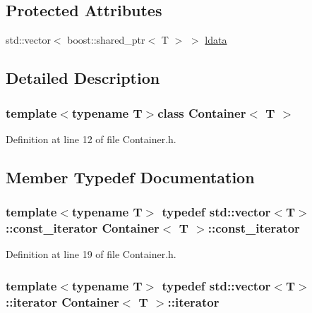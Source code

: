 \subsection*{Protected Attributes}
\begin{DoxyCompactItemize}
\item 
std::vector$<$ boost::shared\_\-ptr$<$ T $>$ $>$ \hyperlink{class_container_aef055b4e4f94e227cc8a2124af13c177}{ldata}
\end{DoxyCompactItemize}


\subsection{Detailed Description}
\subsubsection*{template$<$typename T$>$class Container$<$ T $>$}



Definition at line 12 of file Container.h.



\subsection{Member Typedef Documentation}
\hypertarget{class_container_a14d2de6ebbd48b6b78e8a0d66070c305}{
\subsubsection[{const\_\-iterator}]{\setlength{\rightskip}{0pt plus 5cm}template$<$typename T$>$ typedef std::vector$<$T$>$::{\bf const\_\-iterator} {\bf Container}$<$ T $>$::{\bf const\_\-iterator}}}
\label{class_container_a14d2de6ebbd48b6b78e8a0d66070c305}


Definition at line 19 of file Container.h.

\hypertarget{class_container_a9baa5c3be9ea8fb85a4fd43f29ab7504}{
\subsubsection[{iterator}]{\setlength{\rightskip}{0pt plus 5cm}template$<$typename T$>$ typedef std::vector$<$T$>$::{\bf iterator} {\bf Container}$<$ T $>$::{\bf iterator}}}
\label{class_container_a9baa5c3be9ea8fb85a4fd43f29ab7504}


